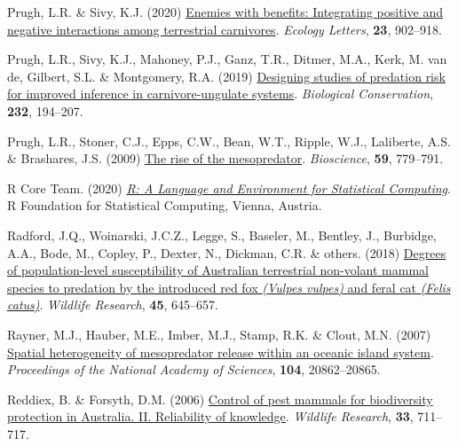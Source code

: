 \documentclass[11pt,a4paper,titlepage,twoside,openright]{style/unimelbthesis}
\newenvironment{CSLReferences}%
  {}%
  {\par}
\begin{document}
\begin{mainmatter}
\begin{CSLReferences}{1}{0}
\leavevmode{}%
Prugh, L.R. \& Sivy, K.J. (2020) \href{https://doi.org/10.1111/ele.13489}{Enemies with benefits: Integrating positive and negative interactions among terrestrial carnivores}. \emph{Ecology Letters}, \textbf{23}, 902--918.

\leavevmode{}%
Prugh, L.R., Sivy, K.J., Mahoney, P.J., Ganz, T.R., Ditmer, M.A., Kerk, M. van de, Gilbert, S.L. \& Montgomery, R.A. (2019) \href{https://doi.org/10.1016/j.biocon.2019.02.011}{Designing studies of predation risk for improved inference in carnivore-ungulate systems}. \emph{Biological Conservation}, \textbf{232}, 194--207.

\leavevmode{}%
Prugh, L.R., Stoner, C.J., Epps, C.W., Bean, W.T., Ripple, W.J., Laliberte, A.S. \& Brashares, J.S. (2009) \href{https://doi.org/10.1525/bio.2009.59.9.9}{The rise of the mesopredator}. \emph{Bioscience}, \textbf{59}, 779--791.

\leavevmode{}%
R Core Team. (2020) \emph{\href{https://www.R-project.org/}{R: A Language and Environment for Statistical Computing}}. R Foundation for Statistical Computing, Vienna, Austria.

\leavevmode{}%
Radford, J.Q., Woinarski, J.C.Z., Legge, S., Baseler, M., Bentley, J., Burbidge, A.A., Bode, M., Copley, P., Dexter, N., Dickman, C.R. \& others. (2018) \href{https://doi.org/10.1071/WR18008}{Degrees of population-level susceptibility of {{A}ustralian} terrestrial non-volant mammal species to predation by the introduced red fox \emph{({Vulpes vulpes})} and feral cat \emph{({Felis catus})}}. \emph{Wildlife Research}, \textbf{45}, 645--657.

\leavevmode{}%
Rayner, M.J., Hauber, M.E., Imber, M.J., Stamp, R.K. \& Clout, M.N. (2007) \href{https://doi.org/10.1073/pnas.0707414105}{Spatial heterogeneity of mesopredator release within an oceanic island system}. \emph{Proceedings of the National Academy of Sciences}, \textbf{104}, 20862--20865.

\leavevmode{}%
Reddiex, B. \& Forsyth, D.M. (2006) \href{https://doi.org/10.1071/WR05103}{Control of pest mammals for biodiversity protection in {A}ustralia. II. Reliability of knowledge}. \emph{Wildlife Research}, \textbf{33}, 711--717.


\end{CSLReferences}
\end{mainmatter}
\end{document}
